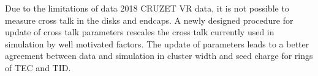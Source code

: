 

Due to the limitations of data 2018 CRUZET VR data, it is not possible to measure cross talk in the disks and endcaps. A newly designed procedure for update of cross talk parameters rescales the cross talk currently used in simulation  by well motivated factors. The update of parameters leads to a better agreement between data and simulation in cluster width and seed charge for rings of TEC and TID.



